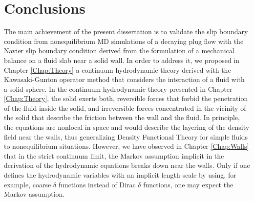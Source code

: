 \documentclass[b5paper,openright,10pt]{book}
\begin{document}
\chapter{Conclusions}\label{Chap:Conclusions}
The main achievement of the present dissertation is to validate the slip boundary condition 
from nonequilibrium MD simulations of a decaying plug flow with the Navier slip boundary condition 
derived from the formulation of a mechanical balance on a fluid slab near a solid wall.  
In order to address it, we proposed in Chapter \ref{Chap:Theory} a continuum hydrodynamic theory 
derived with the Kawasaki-Gunton operator method that considers the interaction of a fluid with a solid sphere. 
In   the    continuum   hydrodynamic   theory   presented    in   Chapter \ref{Chap:Theory},
the  solid  exerts both,  reversible  forces  that
forbid the penetration of the fluid inside the solid, and irreversible
forces concentrated  in the  vicinity of the  solid that  describe the
friction between the  wall and the fluid. In  principle, the equations
are nonlocal in space and would  describe the layering of the density
field near the walls, thus  generalizing Density Functional Theory for
simple  fluids  to  nonequilibrium   situations.   However,  we  have
observed in Chapter \ref{Chap:Walls} that in the  strict continuum  limit, the
Markov  assumption  implicit in  the  derivation  of the  hydrodynamic
equations breaks down  near the  walls.
Only if one defines the hydrodynamic variables with an implicit length
scale    by   using,    for    example,    coarse   $\delta$    functions
instead  of Dirac $\delta$ functions,  one may expect
the Markov assumption.
\end{document}
